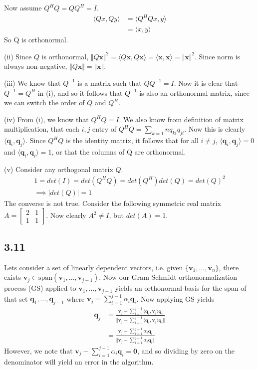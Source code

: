 \documentclass{article}
\newcommand{\inprod}[1]{\langle #1 \rangle}
\begin{document}
	Now assume $Q^H Q = Q Q^H = I$.
	\begin{align*}
	\inprod{Q x, Q y} &= \inprod{Q^H Q x, y} \\
	&= \inprod{x,y}
	\end{align*}
	So Q is orthonormal.
	
	(ii) Since $Q$ is orthonormal, $\Vert Q \mathbf{x} \Vert^2 = \inprod{Q \mathbf{x},Q\mathbf{x}}  = \inprod{\mathbf{x}, \mathbf{x}} = \Vert \mathbf{x} \Vert^2$. Since norm is always non-negative, $\Vert Q \mathbf{x} \Vert = \Vert \mathbf{x} \Vert$.
	
	(iii) We know that $Q^{-1}$ is a matrix such that $Q Q^{-1} = I$. Now it is clear that $Q^{-1} = Q^H$ in (i), and so it follows that $Q^{-1}$ is also an orthonormal matrix, since we can switch the order of $Q$ and $Q^H$.
	
	(iv) From (i), we know that $Q^H Q = I$. We also know from definition of matrix multiplication, that each $i,j$ entry of $Q^H Q = \sum_{k=1}{n} q_{ki} q_{ji}$. Now this is clearly $\inprod{\mathbf{q}_i, \mathbf{q}_j}$. Since $Q^H Q$ is the identity matrix, it follows that for all $i \neq j$, $\inprod{\mathbf{q}_i , \mathbf{q}_j} = 0$ and $\inprod{\mathbf{q}_i, \mathbf{q}_i} = 1$, or that the columns of Q are orthonormal. 
	
	(v) Consider any orthogonal matrix $Q$.
	\begin{align*}
	1 = det(I) = det(Q^H Q) = det(Q^H) det(Q) = det(Q)^2 \\
	\implies | det(Q) | = 1
	\end{align*}
	The converse is not true. Consider the following symmetric real matrix $A = \begin{bmatrix} 2 & 1 \\ 1 & 1 \end{bmatrix}$. Now clearly $A^2 \neq I$, but $det (A) = 1$. 
	
	\subsection*{3.11}
	Lets consider a set of linearly dependent vectors, i.e. given $\{ \mathbf{v}_1,..., \mathbf{v}_n \}$, there exists $\mathbf{v}_j \in \text{span}(\mathbf{v}_1,..., \mathbf{v}_{j-1})$. Now our Gram-Schmidt orthonormalization process (GS) applied to $\mathbf{v}_1,...,\mathbf{v}_{j-1}$ yields an orthonormal-basis for the span of that set $\mathbf{q}_1,..., \mathbf{q}_{j-1}$ where $\mathbf{v}_j = \sum_{i=1}^{j-1} \alpha_i \mathbf{q}_i$. Now applying GS yields
	\begin{align*}
	\mathbf{q}_j &= \frac{\mathbf{v}_j - \sum_{i-1}^{j-1} \inprod{\mathbf{q}_i, \mathbf{v}_j} \mathbf{q}_i}{\Vert\mathbf{v}_j - \sum_{i-1}^{j-1} \inprod{\mathbf{q}_i, \mathbf{v}_j} \mathbf{q}_i \Vert } \\
	&= \frac{\mathbf{v}_j - \sum_{i=1}^{j-1} \alpha_i \mathbf{q}_i}{\Vert \mathbf{v}_j - \sum_{i=1}^{j-1} \alpha_i \mathbf{q}_i \Vert}
	\end{align*} 
	However, we note that $\mathbf{v}_j - \sum_{i=1}^{j-1} \alpha_i \mathbf{q}_i = \mathbf{0}$, and so dividing by zero on the denominator will yield an error in the algorithm.
	
\end{document}
